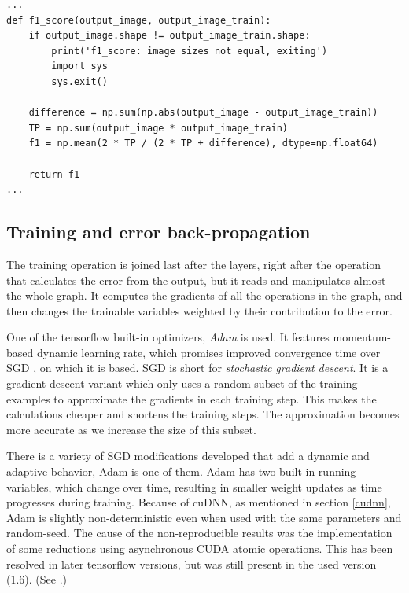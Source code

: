 \documentclass[12pt]{report}
\begin{document}
\begin{center}
	\begin{minipage}{0.95\textwidth}
		\begin{lstlisting}[title=metrics.py]
...
def f1_score(output_image, output_image_train):
	if output_image.shape != output_image_train.shape:
		print('f1_score: image sizes not equal, exiting')
		import sys
		sys.exit()

	difference = np.sum(np.abs(output_image - output_image_train))
	TP = np.sum(output_image * output_image_train)
	f1 = np.mean(2 * TP / (2 * TP + difference), dtype=np.float64)

	return f1
...
		\end{lstlisting}
	\end{minipage}
\end{center}

\subsection{Training and error back-propagation} \label{train}
The training operation is joined last after the layers, right after the operation that calculates the error from the output, but it reads and manipulates almost the whole graph. It computes the gradients of all the operations in the graph, and then changes the trainable variables weighted by their contribution to the error.

One of the tensorflow built-in optimizers, \textit{Adam} \cite{adam} is used. It features momentum-based dynamic learning rate, which promises improved convergence time over SGD \cite{sgd}, on which it is based. SGD is short for \textit{stochastic gradient descent}. It is a gradient descent variant which only uses a random subset of the training examples to approximate the gradients in each training step. This makes the calculations cheaper and shortens the training steps. The approximation becomes more accurate as we increase the size of this subset.

There is a variety of SGD modifications developed that add a dynamic and adaptive behavior, Adam is one of them. Adam has two built-in running variables, which change over time, resulting in smaller weight updates as time progresses during training. Because of cuDNN, as mentioned in section \ref{cudnn}, Adam is slightly non-deterministic even when used with the same parameters and random-seed. The cause of the non-reproducible results was the implementation of some reductions using asynchronous CUDA atomic operations. This has been resolved in later tensorflow versions, but was still present in the used version (1.6). (See \cite{nondet1, nondet2}.)
\end{document}
